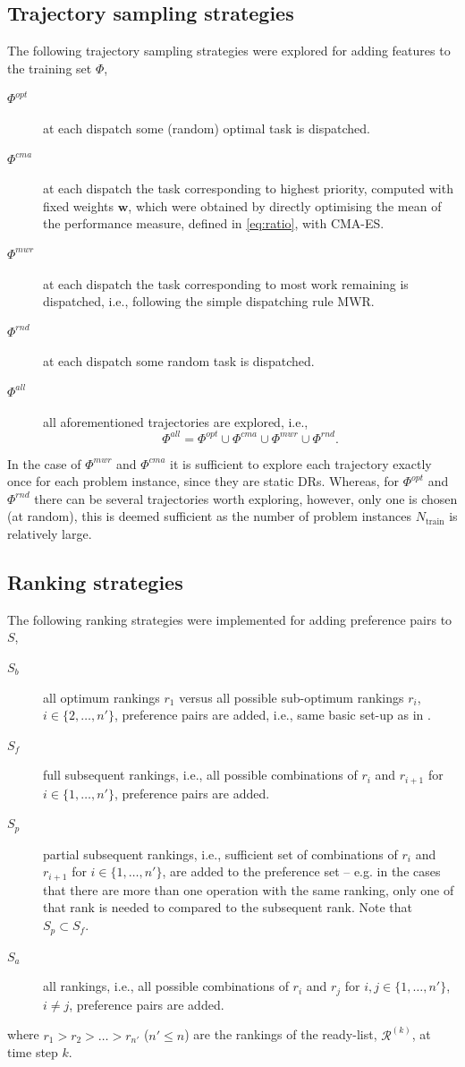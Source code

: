 \documentclass[smallextended]{llncs}
\renewcommand{\vec}[1]{\mathbf{#1}}
\begin{document}
\subsection{Trajectory sampling strategies}\label{sec:tracks}
The following trajectory sampling strategies were explored for adding features to the training set $\Phi$,
\begin{description}
\item[$\Phi^{opt}$] at each dispatch some (random) optimal task is dispatched.
\item[$\Phi^{cma}$] at each dispatch the task corresponding to highest priority, computed with fixed weights $\vec{w}$, which were obtained by directly optimising the mean of the performance measure, defined in \cref{eq:ratio}, with CMA-ES. 
\item[$\Phi^{mwr}$] at each dispatch the task corresponding to most work remaining is dispatched, i.e., following the simple dispatching rule MWR.
\item[$\Phi^{rnd}$] at each dispatch some random task is dispatched.
\item[$\Phi^{all}$] all aforementioned trajectories are explored, i.e., $$\Phi^{all}=\Phi^{opt}\cup \Phi^{cma}\cup \Phi^{mwr} \cup \Phi^{rnd}.$$
\end{description}
In the case of $\Phi^{mwr}$ and $\Phi^{cma}$ it is sufficient to explore each trajectory exactly once for each problem instance, since they are static DRs. Whereas, for $\Phi^{opt}$ and $\Phi^{rnd}$ there can be several trajectories worth exploring, however, only one is chosen (at random), this is deemed sufficient as the number of problem instances $N_{\text{train}}$ is relatively large.

\subsection{Ranking strategies}\label{sec:ranks}
The following ranking strategies were implemented for adding preference pairs to $S$,
\begin{description}
\item[$S_b$] all optimum rankings $r_1$ versus all possible sub-optimum rankings $r_i$, $i\in\{2,\ldots,n'\}$, preference pairs are added, i.e., same basic set-up as in \cite{InRu11a}. %
\item[$S_f$] full subsequent rankings, i.e., all possible combinations of $r_i$ and $r_{i+1}$ for $i\in\{1,\ldots,n'\}$, preference pairs are added.
\item[$S_p$] partial subsequent rankings, i.e., sufficient set of combinations of $r_i$ and $r_{i+1}$ for $i\in\{1,\ldots,n'\}$, are added to the preference set -- e.g. in the cases that there are more than one operation with the same ranking, only one of that rank is needed to compared to the subsequent rank. Note that $S_p\subset S_f$.
\item[$S_a$] all rankings, i.e., all possible combinations of $r_i$ and $r_j$ for $i,j\in\{1,\ldots,n'\}$, \mbox{$i\neq j$}, preference pairs are added.
\end{description}
where $r_1>r_2>\ldots>r_{n'}$ ($n'\leq n$) are the rankings of the ready-list, $\mathcal{R}^{(k)}$, at time step $k$.
\end{document}
